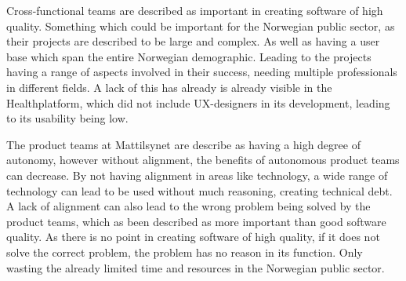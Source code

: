 Cross-functional teams are described as important in creating software of high quality. Something which could be important for the Norwegian public sector, as their projects are described to be large and complex. As well as having a user base which span the entire Norwegian demographic. Leading to the projects having a range of aspects involved in their success, needing multiple professionals in different fields. A lack of this has already is already visible in the Healthplatform, which did not include UX-designers in its development, leading to its usability being low. 

The product teams at Mattilsynet are describe as having a high degree of autonomy, however without alignment, the benefits of autonomous product teams can decrease. By not having alignment in areas like technology, a wide range of technology can lead to be used without much reasoning, creating technical debt. A lack of alignment can also lead to the wrong problem being solved by the product teams, which as been described as more important than good software quality. As there is no point in creating software of high quality, if it does not solve the correct problem, the problem has no reason in its function. Only wasting the already limited time and resources in the Norwegian public sector. 




